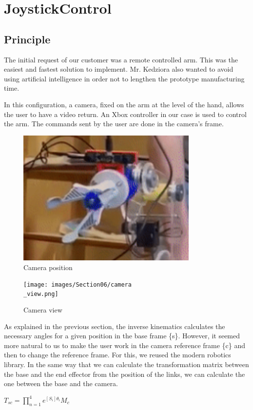 \section{JoystickControl}\insertloftspace
\setcounter{figure}{0}\setcounter{table}{0}

\subsection{Principle}

\hspace{\parindent} The initial request of our customer was a remote controlled arm. This was the easiest and fastest solution to implement. Mr. Kedziora also wanted to avoid using artificial intelligence in order not to lengthen the prototype manufacturing time.

\bigbreak
In this configuration, a camera, fixed on the arm at the level of the hand, allows the user to have a video return. An Xbox controller in our case is used to control the arm. The commands sent by the user are done in the camera's frame.

\begin{figure}[ht]
    \centering
    \includegraphics[width=0.8\textwidth]{images/Section06/camera.png}
    \caption{Camera position}
    \label{fig:mesh16}
\end{figure}
\FloatBarrier

\begin{figure}[ht]
    \centering
    \texttt{[image: images/Section06/camera\\\_view.png]}
    \caption{Camera view}
    \label{fig:mesh17}
\end{figure}
\FloatBarrier

\bigbreak
As explained in the previous section, the inverse kinematics calculates the necessary angles for a given position in the base frame \{s\}. However, it seemed more natural to us to make the user work in the camera reference frame \{c\} and then to change the reference frame. For this, we reused the modern robotics library. In the same way that we can calculate the transformation matrix between the base and the end effector from the position of the links, we can calculate the one between the base and the camera. 
\begin{center}
    $T_{sc} =\displaystyle \prod_{n=1}^4e^{[S_i]\theta_i}M_c$
\end{center}

